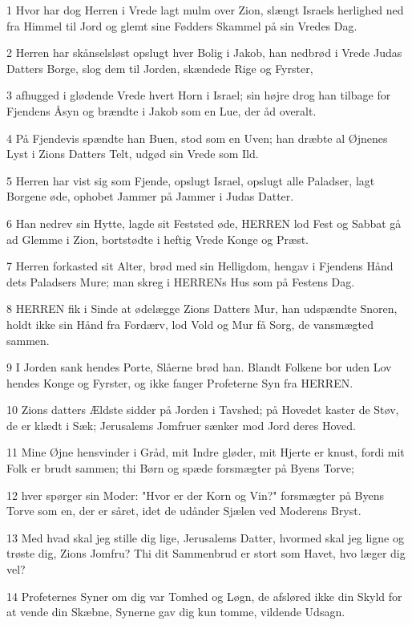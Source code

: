 \par 1 Hvor har dog Herren i Vrede lagt mulm over Zion, slængt Israels herlighed ned fra Himmel til Jord og glemt sine Fødders Skammel på sin Vredes Dag.
\par 2 Herren har skånselsløst opslugt hver Bolig i Jakob, han nedbrød i Vrede Judas Datters Borge, slog dem til Jorden, skændede Rige og Fyrster,
\par 3 afhugged i glødende Vrede hvert Horn i Israel; sin højre drog han tilbage for Fjendens Åsyn og brændte i Jakob som en Lue, der åd overalt.
\par 4 På Fjendevis spændte han Buen, stod som en Uven; han dræbte al Øjnenes Lyst i Zions Datters Telt, udgød sin Vrede som Ild.
\par 5 Herren har vist sig som Fjende, opslugt Israel, opslugt alle Paladser, lagt Borgene øde, ophobet Jammer på Jammer i Judas Datter.
\par 6 Han nedrev sin Hytte, lagde sit Feststed øde, HERREN lod Fest og Sabbat gå ad Glemme i Zion, bortstødte i heftig Vrede Konge og Præst.
\par 7 Herren forkasted sit Alter, brød med sin Helligdom, hengav i Fjendens Hånd dets Paladsers Mure; man skreg i HERRENs Hus som på Festens Dag.
\par 8 HERREN fik i Sinde at ødelægge Zions Datters Mur, han udspændte Snoren, holdt ikke sin Hånd fra Fordærv, lod Vold og Mur få Sorg, de vansmægted sammen.
\par 9 I Jorden sank hendes Porte, Slåerne brød han. Blandt Folkene bor uden Lov hendes Konge og Fyrster, og ikke fanger Profeterne Syn fra HERREN.
\par 10 Zions datters Ældste sidder på Jorden i Tavshed; på Hovedet kaster de Støv, de er klædt i Sæk; Jerusalems Jomfruer sænker mod Jord deres Hoved.
\par 11 Mine Øjne hensvinder i Gråd, mit Indre gløder, mit Hjerte er knust, fordi mit Folk er brudt sammen; thi Børn og spæde forsmægter på Byens Torve;
\par 12 hver spørger sin Moder: "Hvor er der Korn og Vin?" forsmægter på Byens Torve som en, der er såret, idet de udånder Sjælen ved Moderens Bryst.
\par 13 Med hvad skal jeg stille dig lige, Jerusalems Datter, hvormed skal jeg ligne og trøste dig, Zions Jomfru? Thi dit Sammenbrud er stort som Havet, hvo læger dig vel?
\par 14 Profeternes Syner om dig var Tomhed og Løgn, de afsløred ikke din Skyld for at vende din Skæbne, Synerne gav dig kun tomme, vildende Udsagn.
